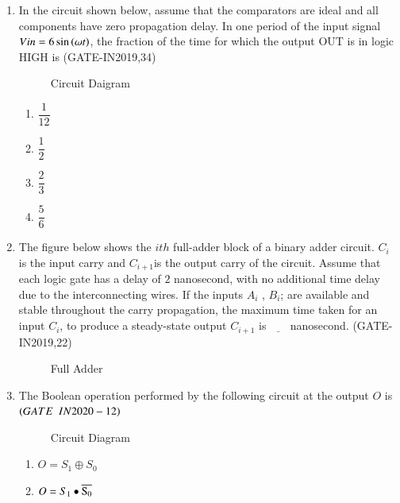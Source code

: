 \begin{enumerate}
	\item In the circuit shown below, assume that the comparators are ideal and all components have zero propagation delay. In one period of the input signal $Vin=6\sin\left(\omega t\right)$, the fraction of the time for which the output OUT is in logic HIGH is
	      \hfill(GATE-IN2019,34)
	      \begin{figure}[H]
		      \centering
		      
		      \caption{Circuit Daigram}
	      \end{figure}
	      \begin{enumerate}
		      \item $\dfrac{1}{12}$
		      \item $\dfrac{1}{2}$
		      \item $\dfrac{2}{3}$
		      \item $\dfrac{5}{6}$
	      \end{enumerate}


	\item The figure below shows the $ith$ full-adder block of a binary adder circuit. $C_i$ is the input carry and $C_{i+1}$is the output carry of the circuit. Assume that each logic gate has a delay of $2$ nanosecond, with no additional time delay due to the interconnecting wires. If the inputs $A_i$ , $B_i$; are available and stable throughout the carry propagation, the maximum time taken for an input $C_i$, to produce a steady-state output $C_{i+1}$ is $\underline{\hspace{18pt}}$ nanosecond.
	      \hfill(GATE-IN2019,22)
	      \begin{figure}[H]
		      \centering
		      
		      \caption{Full Adder}
	      \end{figure}
	\item The Boolean operation performed by the following  circuit at the output $O$ is \underline{\hspace{2cm}}
	      $\hfill\brak{GATE \enspace IN2020-12}$

	      \begin{figure}[H]
		      
		      \caption{Circuit Diagram}
		      \label{fig:figure13}
	      \end{figure}

	      \begin{enumerate}

		      \item  $O=S_1\oplus S_0$

		      \item  $O=S_1\bullet\overline{\rm S_0}$


\end{enumerate}
\end{enumerate}
